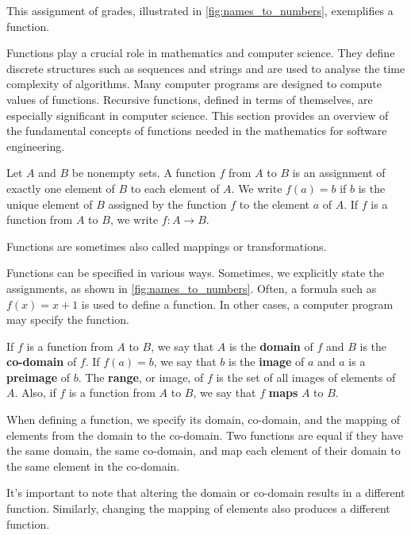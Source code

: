 This assignment of grades, illustrated in \autoref{fig:names_to_numbers}, exemplifies a function.

Functions play a crucial role in mathematics and computer science. They define discrete structures such as sequences and strings and are used to analyse the time complexity of algorithms. Many computer programs are designed to compute values of functions. Recursive functions, defined in terms of themselves, are especially significant in computer science. This section provides an overview of the fundamental concepts of functions needed in the mathematics for software engineering.

\begin{definition}
Let $A$ and $B$ be nonempty sets. A function $f$ from $A$ to $B$ is an assignment of exactly one element of $B$ to each element of $A$. We write $f(a)=b$ if $b$ is the unique element of $B$ assigned by the function $f$ to the element $a$ of $A$. If $f$ is a function from $A$ to $B$, we write $f: A \rightarrow B$.
\end{definition}

\begin{remark}
    Functions are sometimes also called mappings or transformations.
\end{remark}

Functions can be specified in various ways. Sometimes, we explicitly state the assignments, as shown in \autoref{fig:names_to_numbers}. Often, a formula such as \(f(x) = x + 1\) is used to define a function. In other cases, a computer program may specify the function.

\begin{definition}
If $f$ is a function from $A$ to $B$, we say that $A$ is the \textbf{domain} of $f$ and $B$ is the \textbf{co-domain} of $f$. If $f(a)=b$, we say that $b$ is the \textbf{image} of $a$ and $a$ is a \textbf{preimage} of $b$. The \textbf{range}, or image, of $f$ is the set of all images of elements of $A$. Also, if $f$ is a function from $A$ to $B$, we say that $f$ \textbf{maps} $A$ to $B$.    
\end{definition}

When defining a function, we specify its domain, co-domain, and the mapping of elements from the domain to the co-domain. Two functions are equal if they have the same domain, the same co-domain, and map each element of their domain to the same element in the co-domain. 

It's important to note that altering the domain or co-domain results in a different function. Similarly, changing the mapping of elements also produces a different function.


